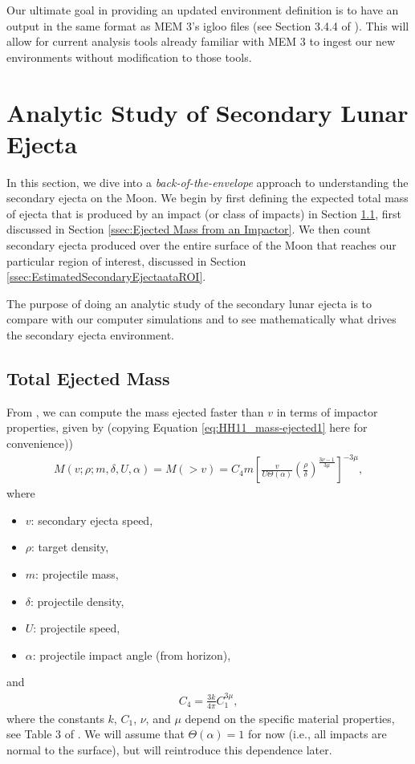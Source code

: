 \documentclass{hitec}
\numberwithin{equation}{section}
\begin{document}
Our ultimate goal in providing an updated environment definition is to have an output in the same format as MEM 3's igloo files (see Section 3.4.4 of \cite{moorhead2019nasa}). This will allow for current analysis tools already familiar with MEM 3 to ingest our new environments without modification to those tools. 


\section{Analytic Study of Secondary Lunar Ejecta}
\label{sec:AnalyticStudyofSecondaryLunarEjecta}

In this section, we dive into a \textit{back-of-the-envelope} approach to understanding the secondary ejecta on the Moon. We begin by first defining the expected total mass of ejecta that is produced by an impact (or class of impacts) in Section \ref{ssec:TotalEjectedMass}, first discussed in Section \ref{ssec:Ejected Mass from an Impactor}. We then count secondary ejecta produced over the entire surface of the Moon that reaches our particular region of interest, discussed in Section \ref{ssec:EstimatedSecondaryEjectaataROI}.

The purpose of doing an analytic study of the secondary lunar ejecta is to compare with our computer simulations and to see mathematically what drives the secondary ejecta environment.

\subsection{Total Ejected Mass}\label{ssec:TotalEjectedMass}
From \cite{housen2011ejecta}, we can compute the mass ejected faster than $v$ in terms of impactor properties, given by (copying Equation \eqref{eq:HH11_mass-ejected1} here for convenience))
\begin{eqnarray}\label{eq:HH11_mass-ejected1-repeat}
M(v; \rho; m, \delta, U, \alpha) = M(>v) = C_4 m\left[\frac{v}{U\Theta(\alpha)}\left(\frac{\rho}{\delta}\right)^{\frac{3\nu-1}{3\mu}}\right]^{-3\mu},
\end{eqnarray}
where
\begin{itemize}
	\item $v$: secondary ejecta speed,
	\item $\rho$: target density,
	\item $m$: projectile mass,
	\item $\delta$: projectile density,
	\item $U$: projectile speed,
	\item $\alpha$: projectile impact angle (from horizon),
\end{itemize}
and
\begin{eqnarray}
C_4 = \frac{3k}{4\pi}C_1^{3\mu},
\end{eqnarray}
where the constants $k$, $C_1$, $\nu$, and $\mu$ depend on the specific material properties, see Table 3 of \cite{housen2011ejecta}. We will assume that $\Theta(\alpha) = 1$ for now (i.e., all impacts are normal to the surface), but will reintroduce this dependence later.
\end{document}
